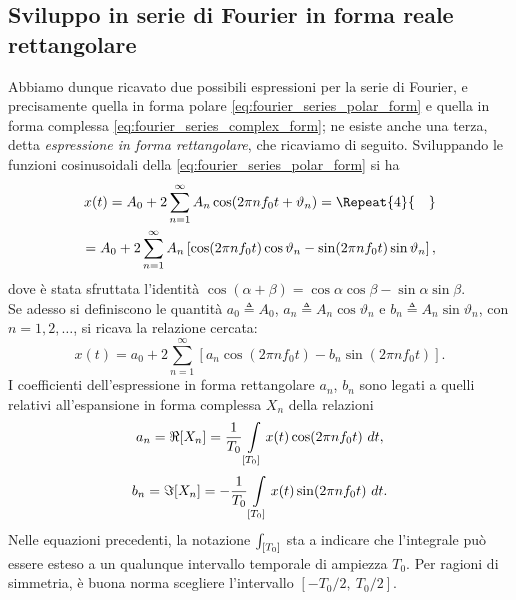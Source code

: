 \documentclass[12pt,oneside,openany]{memoir}
\numberwithin{equation}{subsection}
\newcommand{\quads}[1]{\Repeat{#1}{\quad}}
\newcommand{\dt}{\ dt}
\begin{document}
\subsection{Sviluppo in serie di Fourier in forma reale rettangolare}
Abbiamo dunque ricavato due possibili espressioni per la serie di Fourier, e precisamente quella in forma polare \eqref{eq:fourier_series_polar_form} e quella in forma complessa \eqref{eq:fourier_series_complex_form}; ne esiste anche una terza, detta \textit{espressione in forma rettangolare}, che ricaviamo di seguito. Sviluppando le funzioni cosinusoidali della \eqref{eq:fourier_series_polar_form} si ha
\begin{equation}
\begin{split}
	x(t) = A_0 + 2 \sum_{n = 1}^{\infty} A_n \cos(2 \pi n f_0 t + \vartheta_n) =
	\quads{4}
	\\
	= A_0 + 2 \sum_{n = 1}^{\infty} A_n \left[\cos(2 \pi n f_0 t) \cos\vartheta_n - \sin(2 \pi n f_0 t) \sin\vartheta_n\right],
\end{split}
\end{equation}
dove \`e stata sfruttata l'identit\`a $\cos(\alpha + \beta) = \cos\alpha \cos\beta - \sin\alpha \sin\beta$.\\
Se adesso si definiscono le quantit\`a $a_0 \triangleq A_0$, $a_n \triangleq A_n \cos\vartheta_n$ e $b_n \triangleq A_n \sin\vartheta_n$, con $n = 1, 2, \dots$, si ricava la relazione cercata:
\begin{equation}
	x(t) = a_0 + 2 \sum_{n = 1}^{\infty} \left[a_n \cos(2 \pi n f_0 t) - b_n \sin(2 \pi n f_0 t)\right].
\end{equation}
I coefficienti dell'espressione in forma rettangolare $a_n$, $b_n$ sono legati a quelli relativi all'espansione in forma complessa $X_n$ della relazioni
\begin{equation}
	a_n = \Re[X_n] = \frac{1}{T_0} \int\displaylimits_{[T_0]} x(t) \cos(2 \pi n f_0 t) \dt,
\end{equation}
\begin{equation}
	b_n = \Im[X_n] = -\frac{1}{T_0} \int\displaylimits_{[T_0]} x(t) \sin(2 \pi n f_0 t) \dt.
\end{equation}
Nelle equazioni precedenti, la notazione $\int\displaylimits_{[T_0]}$ sta a indicare che l'integrale pu\`o essere esteso a un qualunque intervallo temporale di ampiezza $T_0$. Per ragioni di simmetria, \`e buona norma scegliere l'intervallo $[-T_0/2, \ T_0/2]$.
\end{document}
